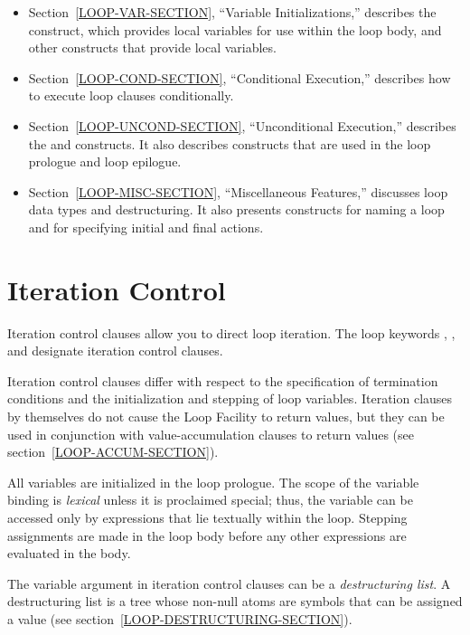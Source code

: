 \begin{new}
\begin{itemize}
\item Section~\ref{LOOP-VAR-SECTION},
``Variable Initializations,'' describes the  
construct, which provides local variables for use within the loop
body, and other constructs that provide local variables.

\item Section~\ref{LOOP-COND-SECTION},
``Conditional Execution,'' describes how to execute loop
clauses conditionally.

\item Section~\ref{LOOP-UNCOND-SECTION},
``Unconditional Execution,'' describes the 
and  constructs.  It also describes constructs that are
used in the loop prologue and loop epilogue.

\item Section~\ref{LOOP-MISC-SECTION},
``Miscellaneous Features,'' discusses loop data types
and destructuring.  It also presents constructs for naming a loop and
for specifying initial and final actions.
\end{itemize}


\section{Iteration Control}
\label{LOOP-ITERATION-SECTION}

Iteration control clauses allow you to direct loop iteration.  The
loop keywords , , and  designate iteration control clauses.

Iteration control clauses differ with respect to the specification of
termination conditions and the initialization and stepping
of loop variables.  Iteration clauses by themselves
do not cause the Loop Facility to return values, but they
can be used in conjunction with value-accumulation clauses to
return values (see section~\ref{LOOP-ACCUM-SECTION}).

All variables are initialized in the loop prologue.  The scope of
the variable binding is {\it lexical} unless it is proclaimed
special; thus, the variable can be
accessed only by expressions that lie textually within the loop.
Stepping assignments are made in the loop body before any other expressions
are evaluated in the body.

The variable argument in iteration control clauses can be a 
{\it destructuring list}.  A destructuring list
is a tree whose non-null atoms are symbols that
can be assigned a value (see section~\ref{LOOP-DESTRUCTURING-SECTION}).


\end{new}
